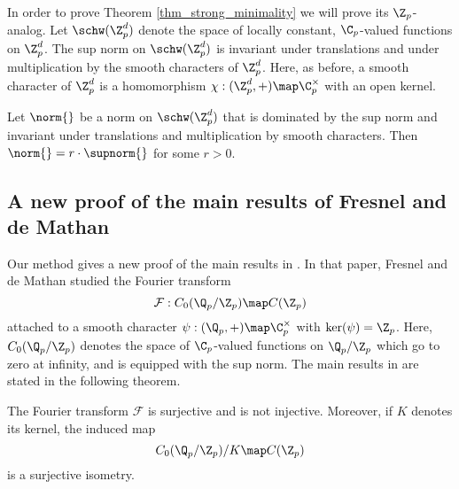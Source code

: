 In order to prove Theorem \ref{thm_strong_minimality} we will prove its $\Z_p$-analog.
Let $\schw(\Z_p^d)$ denote the space of locally constant, $\C_p$-valued functions on $\Z_p^d$.
The sup norm on $\schw(\Z_p^d)$ is invariant under translations and under multiplication by the smooth characters of $\Z_p^d$.
Here, as before, a smooth character of $\Z_p^d$ is a homomorphism $\chi:(\Z_p^d,+)\map \C_p^\times$ with an open kernel.

\begin{thm}\label{thm_strong_minimality_Z_p}
Let $\norm{}$ be a norm on $\schw(\Z_p^d)$ that is dominated by the sup norm and invariant under translations and multiplication by smooth characters.
Then $\norm{}=r\cdot \supnorm{}$ for some $r>0$.
\end{thm} 

\subsection{A new proof of the main results of Fresnel and de Mathan}\label{subsection_new_proof_Fresnel_de_Mathan}
Our method gives a new proof of the main results in \cite{demathan}.
In that paper, Fresnel and de Mathan studied the Fourier transform 
\[\mathcal{F}:C_0(\Q_p/\Z_p)\map C(\Z_p)\]
attached to a smooth character $\psi:(\Q_p,+)\map \C_p^\times$ with $\ker(\psi)=\Z_p$.
Here, $C_0(\Q_p/\Z_p)$ denotes the space of $\C_p$-valued functions on $\Q_p/\Z_p$ which go to zero at infinity, and is equipped with the sup norm.
The main results in \cite{demathan} are stated in the following theorem.
\begin{thm}
The Fourier transform $\mathcal{F}$ is surjective and is not injective.
Moreover, if $K$ denotes its kernel, the induced map 
\[C_0(\Q_p/\Z_p)/K\map C(\Z_p)\]
is a surjective isometry.
\end{thm} 

